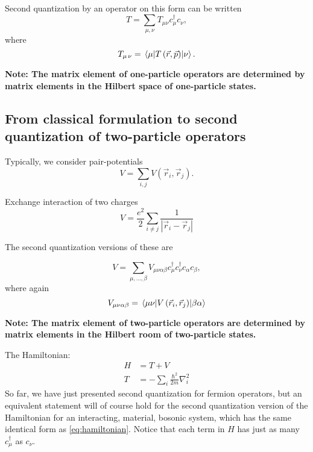 Second quantization by an operator on this form can be written 
\begin{equation}
T = \sum_{\mu, \nu} T_{\mu\nu}c_\mu^\dagger c_{\nu},
\end{equation}
where
\begin{equation}
T_{\mu\,\nu} = \mel{\mu}{T\left(\vec{r}, \vec{p}\right)}{\nu}.	
\end{equation}

\textbf{Note: The matrix element of one-particle operators are determined by matrix elements in the Hilbert space of one-particle states.}

\subsection{From classical formulation to second quantization of two-particle operators}

Typically, we consider pair-potentials 
\begin{equation}
V = \sum_{i, j} V\left(\vec{r}_i, \vec{r}_j\right).
\end{equation}

\begin{theorem}
Exchange interaction of two charges
\begin{equation}
V = \frac{e^2}{2}\sum_{i\ne j} \frac{1}{|\vec{r}_i - \vec{r}_j|}
\end{equation}
\end{theorem}

The second quantization versions of these are

\begin{equation}
V = \sum_{\mu, \dots, \beta} V_{\mu\nu\alpha\beta}c_{\mu}^\dagger c_{\nu}^\dagger c_{\alpha}c_{\beta},
\end{equation}
where again
\begin{equation}
V_{\mu\nu\alpha\beta} = \mel{\mu\nu}{V\left(\vec{r}_i, \vec{r}_j\right)}{\beta\alpha}
\end{equation}

\textbf{Note: The matrix element of two-particle operators are determined by matrix elements in the Hilbert room of two-particle states.}

The Hamiltonian:
\begin{align}
H &= T + V \label{eq:hamiltonian} \\
T &= -\sum_i \frac{\hbar^2}{2m}\nabla_i^2
\end{align}
So far, we have just presented second quantization for fermion operators, but an equivalent statement will of course hold for the second quantization version of the Hamiltonian for an interacting, material, bosonic system, which has the same identical form as \eqref{eq:hamiltonian}. Notice that each term in $H$ has just as many $c_\mu^\dagger$ as $c_{\nu}$.


